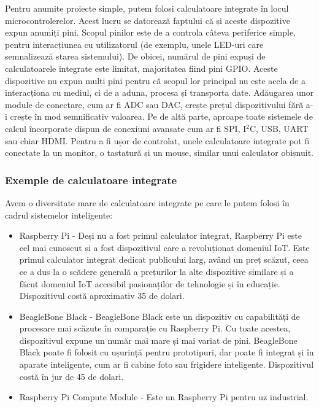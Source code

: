 Pentru anumite proiecte simple, putem folosi calculatoare integrate în locul
microcontrolerelor. Acest lucru se datorează faptului că și aceste dispozitive
expun anumiți pini. Scopul pinilor este de a controla câteva periferice simple,
pentru interacțiunea cu utilizatorul (de exemplu, unele LED-uri
 care semnalizează starea sistemului). De
obicei, numărul de pini expuși de calculatoarele integrate este limitat,
majoritatea fiind pini GPIO. Aceste dispozitive nu expun mulți pini
pentru că scopul lor principal nu este acela de a interacționa cu mediul, ci de
a aduna, procesa și transporta date. Adăugarea unor module de conectare, cum ar
fi ADC sau DAC, crește prețul dispozitivului fără a-i crește în mod semnificativ
valoarea. Pe de altă parte, aproape toate sistemele de calcul încorporate
dispun de conexiuni avansate cum ar fi SPI, I$^2$C, USB, UART sau chiar HDMI. Pentru
a fi ușor de controlat, unele calculatoare integrate pot fi conectate la un
monitor, o tastatură și un mouse, similar unui calculator obișnuit.

\subsubsection{Exemple de calculatoare integrate}
\label{sec:embed:micro-comp:embed:example}

Avem o diversitate mare de calculatoare integrate pe care le putem folosi în
cadrul sistemelor inteligente:

\begin{itemize}
  \item Raspberry Pi - Deși nu a fost primul calculator integrat,
    Raspberry Pi este cel mai cunoscut și a fost dispozitivul care a
    revoluționat domeniul IoT. Este primul calculator integrat
    dedicat publicului larg, având un preț scăzut, ceea ce a dus la
    o scădere generală a prețurilor la alte dispozitive similare și
    a făcut domeniul IoT accesibil pasionaților de tehnologie și în
    educație. Dispozitivul costă aproximativ 35 de dolari.
  \item BeagleBone Black - BeagleBone Black este un dispozitiv cu
    capabilități de procesare mai scăzute în comparație cu Raspberry
    Pi. Cu toate acestea, dispozitivul expune un număr mai mare și
    mai variat de pini. BeagleBone Black poate fi folosit cu
    ușurință pentru prototipuri, dar poate fi integrat și în aparate
    inteligente, cum ar fi cabine foto sau frigidere inteligente.
    Dispozitivul costă în jur de 45 de dolari.
  \item Raspberry Pi Compute Module - Este un Raspberry Pi pentru uz
    industrial.
\end{itemize}

